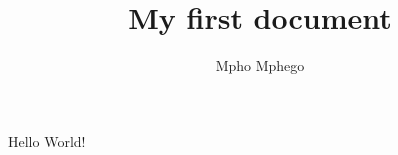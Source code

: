 \documentclass{article}
\title{My first document}
\author{Mpho Mphego}
\date{\currenttime}
\begin{document}
   \maketitle
   \newpage

Hello World!
\end{document}
